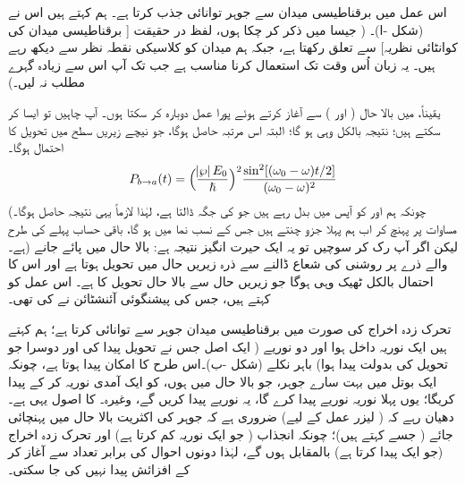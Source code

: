 اس عمل میں برقناطیسی میدان سے جوہر  توانائی جذب کرتا ہے۔ ہم کہتے ہیں اس نے  (شکل -ا)۔ ( جیسا میں ذکر کر چکا ہوں، لفظ  در حقیقت [ برقناطیسی میدان کی کوانٹائی نظریہ] سے تعلق رکھتا ہے، جبکہ ہم میدان کو کلاسیکی نقطہ نظر سے دیکھ رہے ہیں۔ یہ زبان اُس وقت تک استعمال کرنا مناسب ہے جب تک آپ اس سے زیادہ گہرے مطلب نہ لیں۔)

یقیناً، میں بالا حال (  اور ) سے آغاز کرتے ہوئے پورا عمل دوبارہ کر سکتا ہوں۔ آپ چاہیں تو ایسا کر سکتے ہیں؛ نتیجہ بالکل وہی ہو گا؛ البتہ اس
 مرتبہ  حاصل ہوگا، جو نیچے زیریں سطح میں تحویل کا احتمال ہوگا۔
\begin{align}\label{مساوات_تابع_مضطرب_تحویلی_احتمال_سعت}
	P_{b\to a} (t) = \Big(\frac{\abs{\wp}E_0}{\hslash}\Big)^2 \frac{\sin^2[(\omega_0 - \omega)t/2]}{(\omega_0 - \omega)^2}
\end{align}
(چونکہ ہم  اور  کو آپس میں بدل  رہے ہیں جو  کی جگہ  ڈالتا ہے، لہٰذا لازماً یہی نتیجہ حاصل ہوگا۔ مساوات  پر پہنچ کر اب ہم پہلا جزو چنتے ہیں جس کے نسب نما میں  ہو گا، باقی حساب پہلے کی طرح ہے۔) لیکن اگر آپ رک کر سوچیں تو یہ ایک حیرت انگیز نتیجہ ہے: بالا حال میں پائے جانے والے ذرے پر روشنی کی شعاع ڈالنے سے ذرہ زیریں حال میں تحویل ہوتا ہے اور اس کا احتمال بالکل ٹھیک وہی ہوگا جو زیریں حال سے بالا حال تحویل کا ہے۔ اس عمل کو  کہتے ہیں، جس کی پیشنگوئی آئنشٹائن نے کی تھی۔

تحرک زدہ اخراج کی صورت میں برقناطیسی میدان جوہر سے  توانائی کرتا ہے؛ ہم کہتے ہیں ایک نوریہ داخل ہوا اور دو نوریے ( ایک اصل جس نے تحویل پیدا کی اور دوسرا جو تحویل کی بدولت پیدا ہوا) باہر نکلے (شکل -ب)۔اس طرح  کا امکان پیدا ہوتا ہے، چونکہ ایک بوتل میں بہت سارے جوہر، جو بالا حال میں ہوں، کو ایک آمدی نوریہ  کر کے  پیدا کریگا؛ یوں پہلا نوریہ  نوریے پیدا کرے گا، یہ نوریے  پیدا کریں گے، وغیرہ۔ کا اصول یہی ہے۔ دھیان رہے کہ ( لیزر عمل کے لیے) ضروری ہے کہ جوہر کی اکثریت بالا حال میں پہنچائی جائے ( جسے  کہتے ہیں)؛ چونکہ انجذاب ( جو ایک نوریہ کم کرتا ہے) اور تحرک زدہ اخراج (جو ایک پیدا کرتا ہے) بالمقابل ہوں گے، لہٰذا دونوں احوال کی برابر تعداد سے آغاز کر کے افزائش پیدا نہیں کی جا سکتی۔ 

